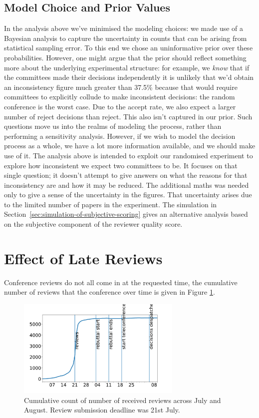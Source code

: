 \subsection{Model Choice and Prior
Values}\label{model-choice-and-prior-values}

In the analysis above we've minimised the modeling choices: we made use
of a Bayesian analysis to capture the uncertainty in counts that can be
arising from statistical sampling error. To this end we chose an
uninformative prior over these probabilities. However, one might argue
that the prior should reflect something more about the underlying
experimental structure: for example, we \emph{know} that if the
committees made their decisions independently it is unlikely that we'd
obtain an inconsistency figure much greater than 37.5\% because that
would require committees to explicitly collude to make inconsistent
decisions: the random conference is the worst case. Due to the accept
rate, we also expect a larger number of reject decisions than reject.
This also isn't captured in our prior. Such questions move us into the
realms of modeling the process, rather than performing a sensitivity
analysis. However, if we wish to model the decision process as a whole,
we have a lot more information available, and we should make use of it.
The analysis above is intended to exploit our randomised experiment to
explore how inconsistent we expect two committees to be. It focuses on
that single question; it doesn't attempt to give answers on what the
reasons for that inconsistency are and how it may be reduced. The
additional maths was needed only to give a sense of the uncertainty in
the figures. That uncertainty arises due to the limited number of papers
in the experiment. The simulation in Section~\ref{sec:simulation-of-subjective-scoring} gives an alternative analysis based on the subjective component of the reviewer quality score.

\section{Effect of Late Reviews}
\label{app:effect-of-late-reviews}

Conference reviews do not all come in at the requested time, the cumulative number of reviews that the conference over time is given in Figure \ref{review-count}.

\begin{figure}[htb]
\centering
\includegraphics[width=0.70\textwidth]{diagrams/neurips/review-count.pdf}
\caption{Cumulative count of number of received reviews across July and August. Review submission deadline was 21st July.}
\label{review-count}
\end{figure}

